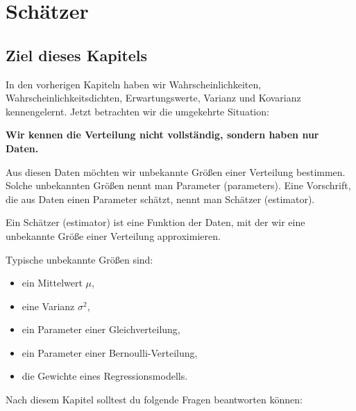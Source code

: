 \chapter{Schätzer}

\section{Ziel dieses Kapitels}

In den vorherigen Kapiteln haben wir Wahrscheinlichkeiten, Wahrscheinlichkeitsdichten, Erwartungswerte, Varianz und Kovarianz kennengelernt.
Jetzt betrachten wir die umgekehrte Situation:

\begin{center}
\textbf{Wir kennen die Verteilung nicht vollständig, sondern haben nur Daten.}
\end{center}

Aus diesen Daten möchten wir unbekannte Größen einer Verteilung bestimmen.
Solche unbekannten Größen nennt man Parameter (parameters).
Eine Vorschrift, die aus Daten einen Parameter schätzt, nennt man Schätzer (estimator).

\begin{conceptbox}
Ein Schätzer (estimator) ist eine Funktion der Daten, mit der wir eine unbekannte Größe einer Verteilung approximieren.

Typische unbekannte Größen sind:

\begin{itemize}
    \item ein Mittelwert \(\mu\),
    \item eine Varianz \(\sigma^2\),
    \item ein Parameter einer Gleichverteilung,
    \item ein Parameter einer Bernoulli-Verteilung,
    \item die Gewichte eines Regressionsmodells.
\end{itemize}
\end{conceptbox}

Nach diesem Kapitel solltest du folgende Fragen beantworten können:


